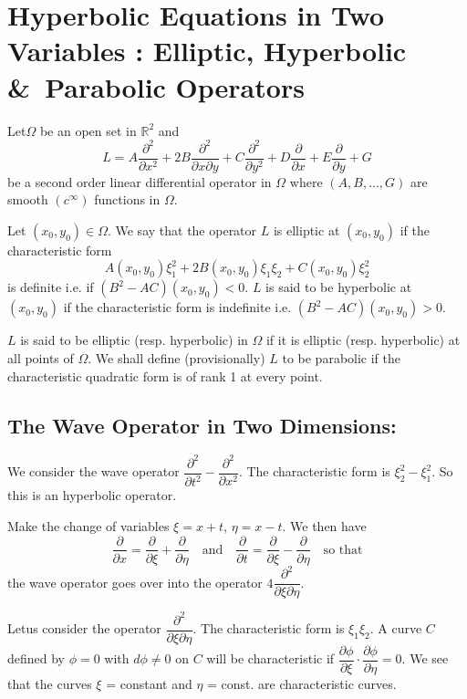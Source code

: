 \chapter{Hyperbolic Equations in Two Variables : Elliptic, Hyperbolic \&\ Parabolic Operators}

\setcounter{pageoriginal}{0}
Let\pageoriginale $\Omega$ be an open set in $\mathbb{R}^{2}$ and
$$
L=A\frac{\partial^{2}}{\partial x^{2}}+2B\frac{\partial^{2}}{\partial x\partial y}+C\frac{\partial^{2}}{\partial y^{2}}+D\frac{\partial}{\partial x}+E\frac{\partial}{\partial y}+G
$$
be a second order linear differential operator in $\Omega$ where $(A,B,\ldots,G)$ are smooth $(c^{\infty})$ functions in $\Omega$.

\begin{defi*}
Let $(x_{0},y_{0})\in \Omega$. We say that the operator $L$ is elliptic at $(x_{0},y_{0})$ if the characteristic form
$$
A(x_{0},y_{0})\xi^{2}_{1}+2B(x_{0},y_{0})\xi_{1}\xi_{2}+C(x_{0},y_{0})\xi^{2}_{2}
$$
is definite i.e. if $(B^{2}-AC)(x_{0},y_{0})<0$. $L$ is said to be hyperbolic at $(x_{0},y_{0})$ if the characteristic form is indefinite i.e. $(B^{2}-AC)(x_{0},y_{0})>0$.
\end{defi*}

$L$ is said to be elliptic (resp. hyperbolic) in $\Omega$ if it is elliptic (resp. hyperbolic) at all points of $\Omega$. We shall define (provisionally) $L$ to be parabolic if the characteristic quadratic form is of rank 1 at every point.

\section*{The Wave Operator in Two Dimensions:}

We consider the wave operator $\dfrac{\partial^{2}}{\partial t^{2}}-\dfrac{\partial^{2}}{\partial x^{2}}$. The characteristic form is $\xi^{2}_{2}-\xi^{2}_{1}$. So this is an hyperbolic operator.

Make the change of variables $\xi=x+t$, $\eta=x-t$. We then have
$$
\frac{\partial}{\partial x}=\frac{\partial}{\partial \xi}+\frac{\partial}{\partial \eta}\quad\text{and}\quad \frac{\partial}{\partial t}=\frac{\partial}{\partial \xi}-\frac{\partial}{\partial\eta}\quad\text{so that}
$$
the wave operator goes over into the operator $4\dfrac{\partial^{2}}{\partial \xi \partial \eta}$.

Let\pageoriginale us consider the operator $\dfrac{\partial^{2}}{\partial \xi \partial \eta}$. The characteristic form is $\xi_{1}\xi_{2}$. A curve $C$ defined by $\phi=0$ with $d\phi\neq 0$ on $C$ will be characteristic if $\dfrac{\partial \phi}{\partial \xi}\cdot \dfrac{\partial \phi}{\partial \eta}=0$. We see that the curves $\xi$ = constant and $\eta$ = const. are characteristic curves.

